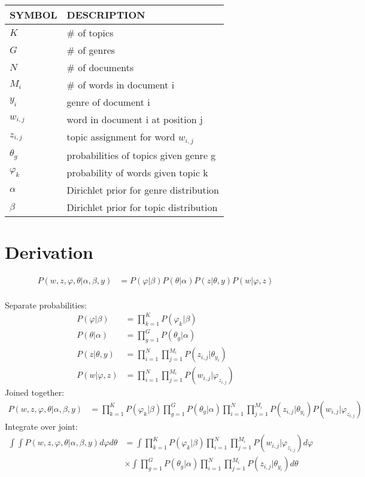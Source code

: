 \documentclass[12pt,a4paper]{amsart}
\begin{document}
\clearpage
\begin{table}[h]
\begin{tabular}{l l}
\tiny\textsc{SYMBOL} & \tiny\textsc{DESCRIPTION}\\
\hline
$K$ & \# of topics\\
$G$ & \# of genres\\
$N$ & \# of documents\\
$M_i$ & \# of words in document i\\
$y_i$ & genre of document i\\
$w_{i,j}$ & word in document i at position j\\
$z_{i,j}$ & topic assignment for word $w_{i,j}$\\
$\theta_g$ & probabilities of topics given genre g\\
$\varphi_k $ & probability of words given topic k\\
$\alpha$ & Dirichlet prior for genre distribution\\
$\beta$ & Dirichlet prior for topic distribution
\end{tabular}
\end{table}
\section{Derivation}
\begin{align}
P(w, z, \varphi, \theta | \alpha, \beta, y) &= P(\varphi | \beta)P(\theta | \alpha)P(z | \theta, y)P(w | \varphi, z)
\end{align}
\\
Separate probabilities:
\begin{align}
P(\varphi | \beta) &= \prod\limits_{k=1}^K P(\varphi_k|\beta)\\
P(\theta | \alpha) &= \prod\limits_{g=1}^G P(\theta_g|\alpha)\\
P(z | \theta, y) &= \prod\limits_{i=1}^N \prod\limits_{j=1}^{M_i} P(z_{i,j}|\theta_{y_i})\\
P(w | \varphi, z) &= \prod\limits_{i=1}^N \prod\limits_{j=1}^{M_i} P(w_{i,j}|\varphi_{z_{i,j}})
\end{align}
Joined together:
\begin{align}
P(w, z, \varphi, \theta | \alpha, \beta, y) &= \prod\limits_{k=1}^K P(\varphi_k|\beta) \prod\limits_{g=1}^G P(\theta_g|\alpha) \prod^N_{i=1}\prod^{M_i}_{j=1} P(z_{i,j}|\theta_{y_i}) P(w_{i,j}|\varphi_{z_{i,j}})
\end{align}
Integrate over joint:
\begin{align}
\int \int P(w, z, \varphi, \theta | \alpha, \beta, y) d\varphi d\theta &= \int \prod\limits_{k=1}^K P(\varphi_k|\beta) \prod^N_{i=1}\prod^{M_i}_{j=1} P(w_{i,j}|\varphi_{z_{i,j}}) d\varphi\\
&\times \int \prod\limits_{g=1}^G P(\theta_g|\alpha) \prod^N_{i=1}\prod^{M_i}_{j=1} P(z_{i,j}|\theta_{y_i}) d\theta
\end{align}


\end{document}
